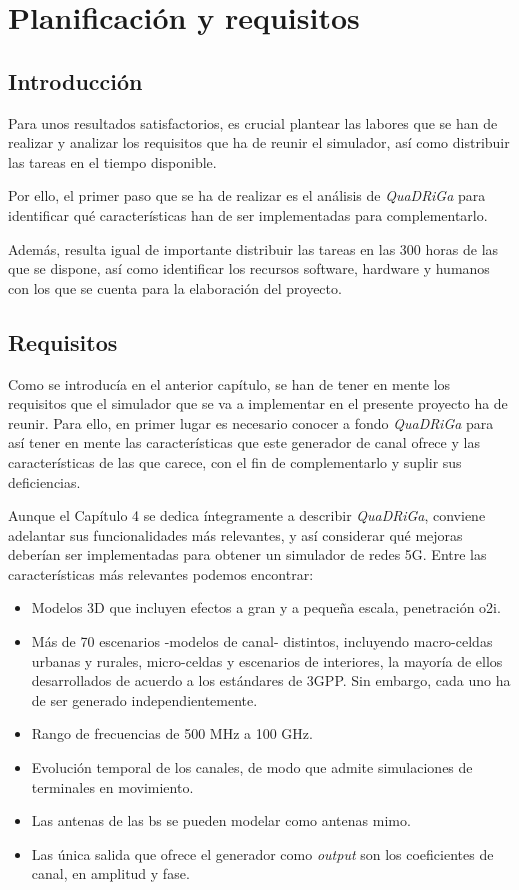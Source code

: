 \chapter{Planificación y requisitos}\label{cap.requisitos}
\section{Introducción}
Para unos resultados satisfactorios, es crucial plantear las labores que se han de realizar y analizar los requisitos que ha de reunir el simulador, así como distribuir las tareas en el tiempo disponible.

Por ello, el primer paso que se ha de realizar es el análisis de \textit{QuaDRiGa} para identificar qué características han de ser implementadas para complementarlo.

Además, resulta igual de importante distribuir las tareas en las 300 horas de las que se dispone, así como identificar los recursos software, hardware y humanos con los que se cuenta para la elaboración del proyecto.

\section{Requisitos}
Como se introducía en el anterior capítulo, se han de tener en mente los requisitos que el simulador que se va a implementar en el presente proyecto ha de reunir. Para ello, en primer lugar es necesario conocer a fondo \textit{QuaDRiGa} para así tener en mente las características que este generador de canal ofrece y las características de las que carece, con el fin de complementarlo y suplir sus deficiencias.

Aunque el Capítulo 4 se dedica íntegramente a describir \textit{QuaDRiGa}, conviene adelantar sus funcionalidades más relevantes, y así considerar qué mejoras deberían ser implementadas para obtener un simulador de redes 5G. Entre las características más relevantes podemos encontrar:

\begin{itemize}
    \item Modelos 3D que incluyen efectos a gran y a pequeña escala, penetración \ac{o2i}.
    \item Más de 70 escenarios -modelos de canal- distintos, incluyendo macro-celdas urbanas y rurales, micro-celdas y escenarios de interiores, la mayoría de ellos desarrollados de acuerdo a los estándares de 3GPP. Sin embargo, cada uno ha de ser generado independientemente.
    \item Rango de frecuencias de 500 MHz a 100 GHz.
    \item Evolución temporal de los canales, de modo que admite simulaciones de terminales en movimiento.
    \item Las antenas de las \acs{bs} se pueden modelar como antenas \ac{mimo}.
    \item Las única salida que ofrece el generador como \textit{output} son los coeficientes de canal, en amplitud y fase.
\end{itemize}

